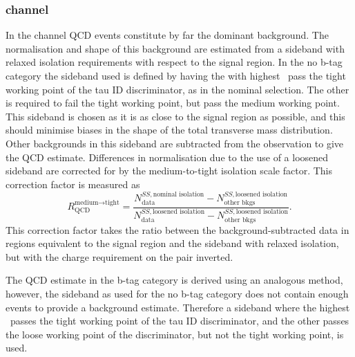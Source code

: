 \subsubsection{\texorpdfstring{\tautau channel}{tau tau channel}}
\label{sec:mssm_bkgs_qcd_tt}
In the \tautau channel QCD events constitute by far the dominant background.
The normalisation and shape 
of this background are estimated from a sideband with relaxed 
isolation requirements with respect to the signal region. 
In the no b-tag category the sideband used is defined
by having the \Pgth with highest \pT~pass the tight working
point of the tau ID discriminator, as in the nominal selection.
The other \Pgth is required to fail the tight working point,
but pass the medium working point. This sideband is 
chosen as it is as close to the signal region as possible, and 
this should minimise biases in the shape of the total transverse mass
distribution. Other backgrounds
in this sideband are subtracted from the observation to give
the QCD estimate. Differences in normalisation due to
the use of a loosened sideband are corrected for by the medium-to-tight isolation
scale factor. This correction factor is measured as
\begin{equation}\label{eqn:tautau_qcd}
R_{\text{QCD}}^{\text{medium}\rightarrow\text{tight}} = \frac{N_{\text{data}}^{SS,\text{nominal isolation}}-N_{\text{other bkgs}}^{SS,\text{loosened isolation}}}{N_{\text{data}}^{SS,\text{loosened isolation}}-N_{\text{other bkgs}}^{SS,\text{loosened isolation}}}.
\end{equation}
This correction factor takes the ratio between the background-subtracted data in regions 
equivalent to the signal region and the sideband with relaxed isolation, but with the
charge requirement on the pair inverted.

The QCD estimate in the b-tag category is derived using an analogous method, 
 however, the sideband as used for the 
no b-tag category does not contain enough events to 
provide a background estimate. Therefore a sideband where
the highest \pT~\Pgth passes the tight working point of the
tau ID discriminator, and the other \Pgth passes the loose working
point of the discriminator, but not the tight working point, is used.

